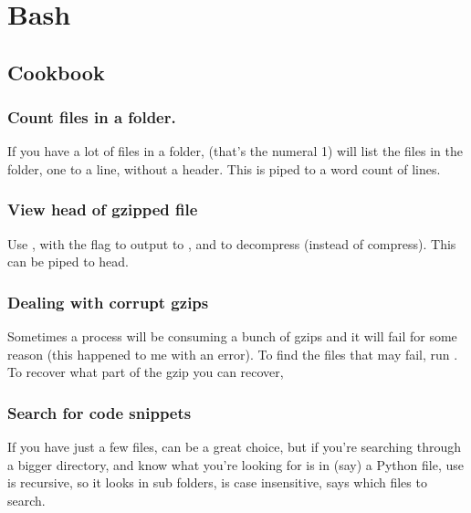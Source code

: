 \chapter{Bash}

\section{Cookbook}


\subsection{Count files in a folder.}

If you have a lot of files in a folder,  (that's the numeral 1)
will list the files in the folder, one to a line, without a header.  This
is piped to a word count of lines.




\subsection{View head of gzipped file}

Use , with the  flag to output to , and 
 to decompress (instead of compress).  This can be piped to head.



\subsection{Dealing with corrupt gzips}

Sometimes a process will be consuming a bunch of gzips and it will
fail for some reason (this happened to me with an
 error). To find the files that may fail,
run . To recover what part of the gzip you can recover,

\subsection{Search for code snippets}

If you have just a few files,  can be a great choice, but
if you're searching through a bigger directory, and know what you're
looking for is in (say) a Python file, use 
 is recursive, so it looks in sub folders,  is case
insensitive,  says which files to search.
